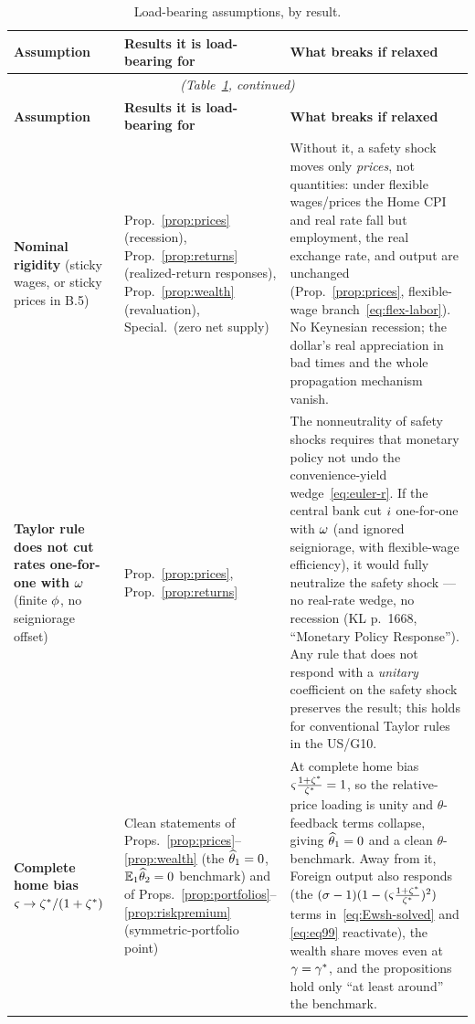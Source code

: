 \begin{longtable}{p{} p{} p{}}
\caption{Load-bearing assumptions, by result.}\label{tab:load-bearing}\\
\toprule
\textbf{Assumption} & \textbf{Results it is load-bearing for} & \textbf{What breaks if relaxed}\\
\midrule
\endfirsthead
\multicolumn{3}{c}{\emph{(Table~\ref{tab:load-bearing}, continued)}}\\
\toprule
\textbf{Assumption} & \textbf{Results it is load-bearing for} & \textbf{What breaks if relaxed}\\
\midrule
\endhead
\bottomrule
\endfoot

\textbf{Nominal rigidity} (sticky wages, or sticky prices in B.5)
& Prop.~\ref{prop:prices} (recession), Prop.~\ref{prop:returns}
(realized-return responses), Prop.~\ref{prop:wealth} (revaluation),
Special.~(zero net supply)
& Without it, a safety shock moves only \emph{prices}, not quantities: under
flexible wages/prices the Home CPI and real rate fall but employment, the real
exchange rate, and output are unchanged (Prop.~\ref{prop:prices}, flexible-wage
branch~\eqref{eq:flex-labor}). No Keynesian recession; the dollar's real
appreciation in bad times and the whole propagation mechanism vanish.\\

\textbf{Taylor rule does not cut rates one-for-one with $\omega$}
(finite $\phi$, no seigniorage offset)
& Prop.~\ref{prop:prices}, Prop.~\ref{prop:returns}
& The nonneutrality of safety shocks requires that monetary policy not undo the
convenience-yield wedge~\eqref{eq:euler-r}. If the central bank cut $i$
one-for-one with $\omega$ (and ignored seigniorage, with flexible-wage efficiency),
it would fully neutralize the safety shock --- no real-rate wedge, no recession
(KL p.~1668, ``Monetary Policy Response''). Any rule that does not respond with a
\emph{unitary} coefficient on the safety shock preserves the result; this holds
for conventional Taylor rules in the US/G10.\\

\textbf{Complete home bias} $\varsigma\to\zeta^{*}/(1+\zeta^{*})$
& Clean statements of Props.~\ref{prop:prices}--\ref{prop:wealth} (the
$\widehat{\theta}_1=0$, $\mathbb{E}_1\widehat{\theta}_2=0$ benchmark) and of
Props.~\ref{prop:portfolios}--\ref{prop:riskpremium} (symmetric-portfolio point)
& At complete home bias $\varsigma\frac{1+\zeta^{*}}{\zeta^{*}}=1$, so the relative-price loading
is unity and $\theta$-feedback terms collapse, giving $\widehat{\theta}_1=0$ and a clean
$\theta$-benchmark. Away from it, Foreign output also responds (the
$(\sigma-1)(1-(\varsigma\frac{1+\zeta^{*}}{\zeta^{*}})^2)$ terms in~\eqref{eq:Ewsh-solved} and
\eqref{eq:eq99} reactivate), the wealth share moves even at $\gamma=\gamma^{*}$, and the
propositions hold only ``at least around'' the benchmark.\\


\end{longtable}
